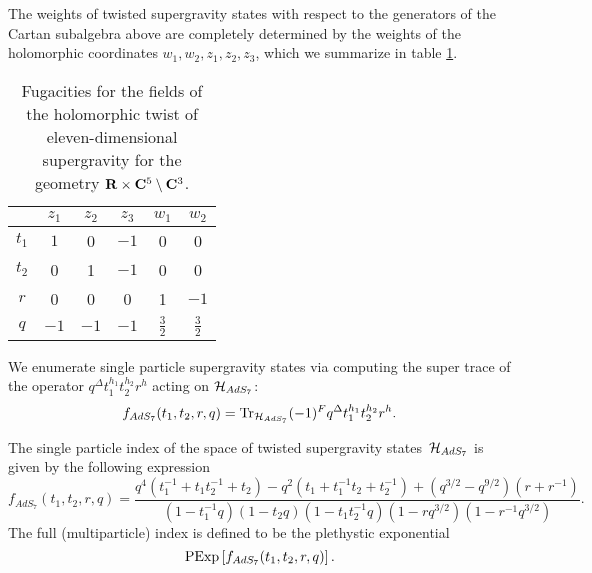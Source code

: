 \documentclass[../main.tex]{subfiles}
\begin{document}
The weights of twisted supergravity states with respect to the generators of the Cartan subalgebra above are completely determined by the weights of the holomorphic coordinates $w_1, w_2, z_1, z_2, z_3$, which we summarize in table \ref{tbl:sugraM5}.

\begin{table}
\begin{center}
\begin{tabular}{c c c c c c}
  & $z_{1}$ & $z_{2}$ & $z_{3}$ & $w_{1}$ & $w_{2}$ \\
  \hline
  $t_{1}$ & $1$ & 0 & $-1$ & 0 & 0 \\
  $t_{2}$ & 0 & 1 & $-1$ & 0 & 0 \\
  $r$ & 0 & 0 & 0 & 1 & $-1$ \\
  $q$ & $-1$ & $-1$ & $-1$ & $\frac{3}{2}$ & $\frac{3}{2}$
\end{tabular}
\caption{Fugacities for the fields of the holomorphic twist of eleven-dimensional supergravity for the geometry $\mathbf{R} \times \mathbf{C}^5 \setminus \mathbf{C}^3$.}
\label{tbl:sugraM5}
\end{center}
\end{table}

We enumerate single particle supergravity states via computing the super trace of the operator $q^\Delta t_1^{h_1} t_2^{h_2} r^h$ acting on $\mathcal{H}_{AdS_7}$:
\begin{equation}
f_{AdS_7}(t_1,t_2,r,q) = \text{Tr}_{\mathcal{H}_{AdS_7}} (-1)^F q^\Delta t_1^{h_1} t_2^{h_2} r^h  .
\end{equation}

\begin{prop}
\label{prop:sugraindex1}
The single particle index of the space of twisted supergravity states~$\mathcal{H}_{AdS_7}$ is given by the following expression
\begin{equation}
\label{eqn:sugra_index}
f_{AdS_7} (t_1,t_2, r, q) = \frac{q^4(t_1^{-1}+t_1t_2^{-1}+t_2)-q^2(t_1+t_1^{-1}t_2+t_2^{-1})+(q^{3/2}-q^{9/2})(r+r^{-1})}{(1-t_{1}^{-1}q)(1-t_{2}q)(1-t_{1}t_{2}^{-1}q)(1-rq^{3/2})(1-r^{-1}q^{3/2})}.
\end{equation}
The full (multiparticle) index is defined to be the plethystic exponential 
\begin{equation}
{\rm PExp}\left[f_{AdS_7}(t_1,t_2,r,q)\right] .
\end{equation}
\end{prop}
\end{document}
